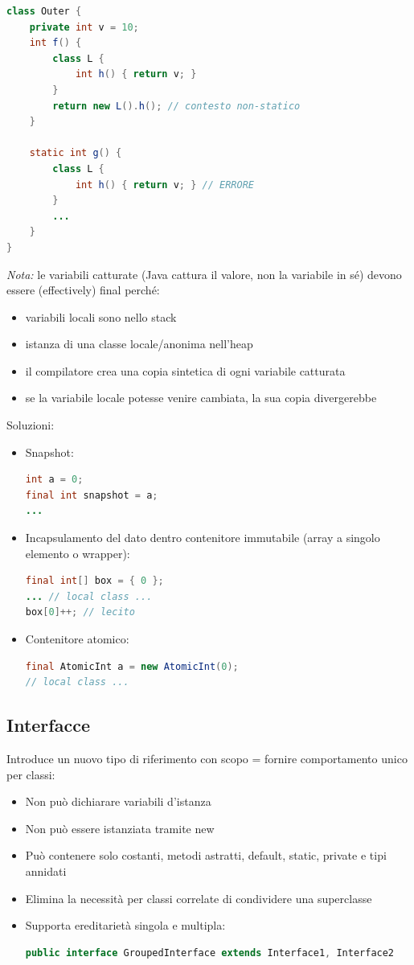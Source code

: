 \documentclass[12pt]{extarticle}
\begin{document}
\begin{lstlisting}[language=Java]
class Outer {
    private int v = 10;
    int f() {
        class L {
            int h() { return v; }
        }
        return new L().h(); // contesto non-statico
    }

    static int g() {
        class L {
            int h() { return v; } // ERRORE
        }
        ...
    }
}
\end{lstlisting}

\noindent \textit{Nota:} le variabili catturate (Java cattura il valore, non la variabile in sé) devono essere (effectively) final perché:
\begin{itemize}
    \item variabili locali sono nello stack
    \item istanza di una classe locale/anonima nell'heap
    \item il compilatore crea una copia sintetica di ogni variabile catturata
    \item se la variabile locale potesse venire cambiata, la sua copia divergerebbe
\end{itemize}
Soluzioni:
\begin{itemize}
    \item Snapshot:
\begin{lstlisting}[language=Java]
int a = 0;
final int snapshot = a;
...
\end{lstlisting}

    \item Incapsulamento del dato dentro contenitore immutabile (array a singolo elemento o wrapper):
\begin{lstlisting}[language=Java]
final int[] box = { 0 };
... // local class ...
box[0]++; // lecito
\end{lstlisting}

    \item Contenitore atomico:
\begin{lstlisting}[language=Java]
final AtomicInt a = new AtomicInt(0);
// local class ...
\end{lstlisting}
\end{itemize}

\subsection{Interfacce}
Introduce un nuovo tipo di riferimento con scopo = fornire comportamento unico per classi:
\begin{itemize}
    \item Non può dichiarare variabili d'istanza
    \item Non può essere istanziata tramite new
    \item Può contenere solo costanti, metodi astratti, default, static, private e tipi annidati
    \item Elimina la necessità per classi correlate di condividere una superclasse
    \item Supporta ereditarietà singola e multipla:
\begin{lstlisting}[language=Java]
public interface GroupedInterface extends Interface1, Interface2
\end{lstlisting}
\end{itemize}
\end{document}
